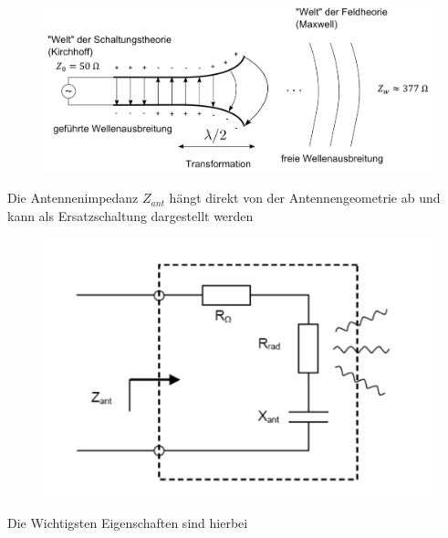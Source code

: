 \documentclass[
  10pt,
  a4paper,
  german]{article}
\numberwithin{equation}{section}
\begin{document}
\begin{figure}[H]

{\centering \includegraphics{images/04_Impedanzwandler.png}

}

\end{figure}

Die Antennenimpedanz \(Z_{ant}\) hängt direkt von der Antennengeometrie
ab und kann als Ersatzschaltung dargestellt werden

\begin{figure}[H]

{\centering \includegraphics{images/04_ErsatzschaltungImpedanz.png}

}

\end{figure}

Die Wichtigsten Eigenschaften sind hierbei
\end{document}
